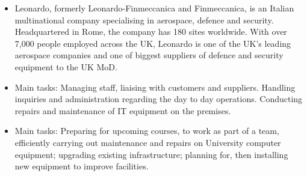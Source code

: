 \documentclass[8pt,a4paper]{altacv}
\begin{document}

\begin{fullwidth}
\makecvheader
\end{fullwidth}



\begin{itemize}
\item Leonardo, formerly Leonardo-Finmeccanica and Finmeccanica, is an Italian multinational company specialising in aerospace, defence and security. Headquartered in Rome, the company has 180 sites worldwide. With over 7,000 people employed across the UK, Leonardo is one of the UK's leading aerospace companies and one of biggest suppliers of defence and security equipment to the UK MoD.
\divider
\end{itemize}

\begin{itemize}
\item Main tasks: Managing staff, liaising with customers and suppliers. Handling inquiries and administration regarding the day to day operations. Conducting repairs and maintenance of IT equipment on the premises. 
\divider
\end{itemize}

\begin{itemize}
\item Main tasks: Preparing for upcoming courses, to work as part of a team, efficiently carrying out maintenance and repairs on University computer equipment; upgrading existing infrastructure; planning for, then installing new equipment to improve facilities.
\end{itemize}
\end{document}
